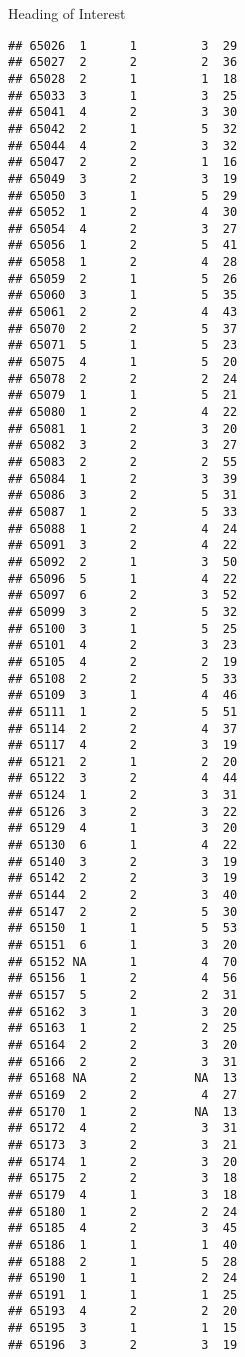 \documentclass[
  ignorenonframetext,
]{beamer}
\begin{document}
\begin{frame}[fragile]{Heading of Interest}
\begin{verbatim}
## 65026  1      1         3  29
## 65027  2      2         2  36
## 65028  2      1         1  18
## 65033  3      1         3  25
## 65041  4      2         3  30
## 65042  2      1         5  32
## 65044  4      2         3  32
## 65047  2      2         1  16
## 65049  3      2         3  19
## 65050  3      1         5  29
## 65052  1      2         4  30
## 65054  4      2         3  27
## 65056  1      2         5  41
## 65058  1      2         4  28
## 65059  2      1         5  26
## 65060  3      1         5  35
## 65061  2      2         4  43
## 65070  2      2         5  37
## 65071  5      1         5  23
## 65075  4      1         5  20
## 65078  2      2         2  24
## 65079  1      1         5  21
## 65080  1      2         4  22
## 65081  1      2         3  20
## 65082  3      2         3  27
## 65083  2      2         2  55
## 65084  1      2         3  39
## 65086  3      2         5  31
## 65087  1      2         5  33
## 65088  1      2         4  24
## 65091  3      2         4  22
## 65092  2      1         3  50
## 65096  5      1         4  22
## 65097  6      2         3  52
## 65099  3      2         5  32
## 65100  3      1         5  25
## 65101  4      2         3  23
## 65105  4      2         2  19
## 65108  2      2         5  33
## 65109  3      1         4  46
## 65111  1      2         5  51
## 65114  2      2         4  37
## 65117  4      2         3  19
## 65121  2      1         2  20
## 65122  3      2         4  44
## 65124  1      2         3  31
## 65126  3      2         3  22
## 65129  4      1         3  20
## 65130  6      1         4  22
## 65140  3      2         3  19
## 65142  2      2         3  19
## 65144  2      2         3  40
## 65147  2      2         5  30
## 65150  1      1         5  53
## 65151  6      1         3  20
## 65152 NA      1         4  70
## 65156  1      2         4  56
## 65157  5      2         2  31
## 65162  3      1         3  20
## 65163  1      2         2  25
## 65164  2      2         3  20
## 65166  2      2         3  31
## 65168 NA      2        NA  13
## 65169  2      2         4  27
## 65170  1      2        NA  13
## 65172  4      2         3  31
## 65173  3      2         3  21
## 65174  1      2         3  20
## 65175  2      2         3  18
## 65179  4      1         3  18
## 65180  1      2         2  24
## 65185  4      2         3  45
## 65186  1      1         1  40
## 65188  2      1         5  28
## 65190  1      1         2  24
## 65191  1      1         1  25
## 65193  4      2         2  20
## 65195  3      1         1  15
## 65196  3      2         3  19

\end{verbatim}
\end{frame}
\end{document}
